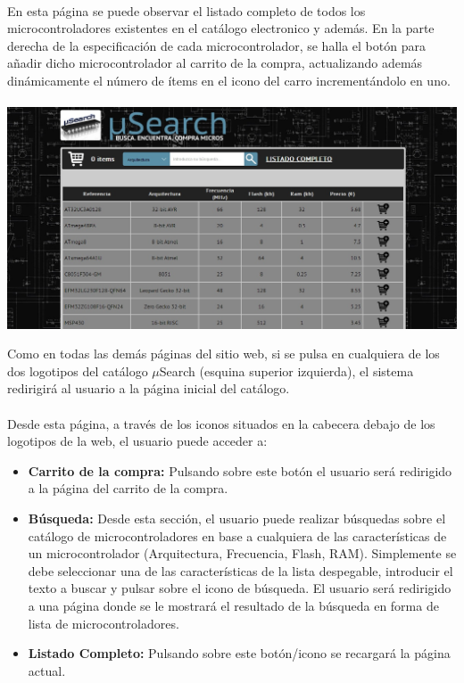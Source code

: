 \paragraph{}En esta página se puede observar el listado completo de todos los microcontroladores existentes en el catálogo electronico y además. En la parte derecha de la especificación de cada microcontrolador, se halla el botón para añadir dicho microcontrolador al carrito de la compra, actualizando además dinámicamente el número de ítems en el icono del carro incrementándolo en uno.

\begin{center}
	\paragraph{}\includegraphics[scale=0.35]{img/listado_completo_user}\singlelinebreak
\end{center}

Como en todas las demás páginas del sitio web, si se pulsa en cualquiera de los dos logotipos del catálogo $\mu$Search (esquina superior izquierda), el sistema redirigirá al usuario a la página inicial del catálogo.

\paragraph{}Desde esta página, a través de los iconos situados en la cabecera debajo de los logotipos de la web, el usuario puede acceder a:

\begin{itemize}
	\item\textbf{Carrito de la compra:} Pulsando sobre este botón el usuario será redirigido a la página del carrito de la compra.
		
	\item \textbf{Búsqueda:} Desde esta sección, el usuario puede realizar búsquedas sobre el catálogo de microcontroladores en base a cualquiera de las características de un microcontrolador (Arquitectura, Frecuencia, Flash, RAM). Simplemente se debe seleccionar una de las características de la lista despegable, introducir el texto a buscar y pulsar sobre el icono de búsqueda.
	El usuario será redirigido a una página donde se le mostrará el resultado de la búsqueda en forma de lista de microcontroladores.
		
	\item \textbf{Listado Completo:} Pulsando sobre este botón/icono se recargará la página actual.
\end{itemize}
